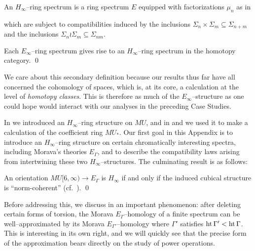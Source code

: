 \begin{definition}
An \(H_\infty\)--ring spectrum is a ring spectrum \(E\) equipped with factorizations \(\mu_n\) as in
\begin{center}
\end{center}
which are subject to compatibilities induced by the inclusions \(\Sigma_n \times \Sigma_m \subseteq \Sigma_{n+m}\) and the inclusions \(\Sigma_n \wr \Sigma_m \subseteq \Sigma_{nm}\).
\end{definition}

\begin{lemma}
Each \(E_\infty\)--ring spectrum gives rise to an \(H_\infty\)--ring spectrum in the homotopy category. \qed
\end{lemma}

\noindent We care about this secondary definition because our results thus far have all concerned the cohomology of spaces, which is, at its core, a calculation at the level of \emph{homotopy classes}.  This is therefore as much of the \(E_\infty\)--structure as one could hope would interact with our analyses in the preceding Case Studies.

In  we introduced an \(H_\infty\)--ring structure on \(MU\), and in  and  we used it to make a calculation of the coefficient ring \(MU_*\).  Our first goal in this Appendix is to introduce an \(H_\infty\)--ring structure on certain chromatically interesting spectra, including Morava's theories \(E_\Gamma\), and to describe the compatibility laws arising from intertwining these two \(H_\infty\)--structures.  The culminating result is as follows:

\begin{theorem}
An orientation \(MU[6, \infty) \to E_\Gamma\) is \(H_\infty\) if and only if the induced cubical structure is ``norm-coherent'' (cf.\ ). \qed
\end{theorem}

\noindent Before addressing this, we discuss in  an important phenomenon: after deleting certain forms of torsion, the Morava \(E_\Gamma\)--homology of a finite spectrum can be well--approximated by its Morava \(E_{\Gamma'}\)--homology where \(\Gamma'\) satisfies \(\operatorname{ht}{\Gamma'} < \operatorname{ht}{\Gamma}\).  This is interesting in its own right, and we will quickly see that the precise form of the approximation bears directly on the study of power operations.

